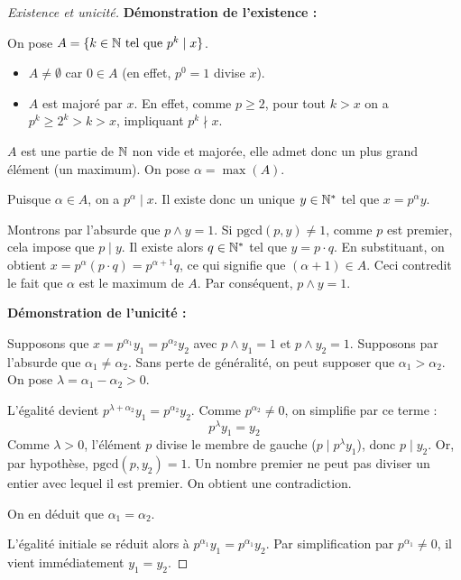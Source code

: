 \documentclass[12pt, a4paper]{report}
\begin{document}
\begin{proof}[Existence et unicité]
    \textbf{Démonstration de l'existence :}

    On pose $A = \{k \in \mathbb{N} \text{ tel que } p^k \mid x\}$.
    \begin{itemize}
        \item $A \neq \emptyset$ car $0 \in A$ (en effet, $p^0 = 1$ divise $x$).
        \item $A$ est majoré par $x$. En effet, comme $p \ge 2$, pour tout $k > x$ on a $p^k \ge 2^k > k > x$, impliquant $p^k \nmid x$.
    \end{itemize}
    $A$ est une partie de $\mathbb{N}$ non vide et majorée, elle admet donc un plus grand élément (un maximum). On pose $\alpha = \max(A)$.
    
    Puisque $\alpha \in A$, on a $p^\alpha \mid x$. Il existe donc un unique $y \in \mathbb{N}^*$ tel que $x = p^\alpha y$.
    
    Montrons par l'absurde que $p \wedge y = 1$. 
    Si $\text{pgcd}(p, y) \neq 1$, comme $p$ est premier, cela impose que $p \mid y$. Il existe alors $q \in \mathbb{N}^*$ tel que $y = p \cdot q$.
    En substituant, on obtient $x = p^\alpha (p \cdot q) = p^{\alpha+1} q$, ce qui signifie que $(\alpha + 1) \in A$.
    Ceci contredit le fait que $\alpha$ est le maximum de $A$. Par conséquent, $p \wedge y = 1$.

    \textbf{Démonstration de l'unicité :}

    Supposons que $x = p^{\alpha_1}y_1 = p^{\alpha_2}y_2$ avec $p \wedge y_1 = 1$ et $p \wedge y_2 = 1$.
    Supposons par l'absurde que $\alpha_1 \ne \alpha_2$.
    Sans perte de généralité, on peut supposer que $\alpha_1 > \alpha_2$. On pose $\lambda = \alpha_1 - \alpha_2 > 0$.
    
    L'égalité devient $p^{\lambda + \alpha_2} y_1 = p^{\alpha_2} y_2$. Comme $p^{\alpha_2} \neq 0$, on simplifie par ce terme :
    $$p^{\lambda} y_1 = y_2$$
    Comme $\lambda > 0$, l'élément $p$ divise le membre de gauche ($p \mid p^\lambda y_1$), donc $p \mid y_2$.
    Or, par hypothèse, $\text{pgcd}(p, y_2) = 1$. Un nombre premier ne peut pas diviser un entier avec lequel il est premier. On obtient une contradiction.
    
    On en déduit que $\alpha_1 = \alpha_2$.
    
    L'égalité initiale se réduit alors à $p^{\alpha_1}y_1 = p^{\alpha_1}y_2$. Par simplification par $p^{\alpha_1} \neq 0$, il vient immédiatement $y_1 = y_2$.
\end{proof}
\end{document}
